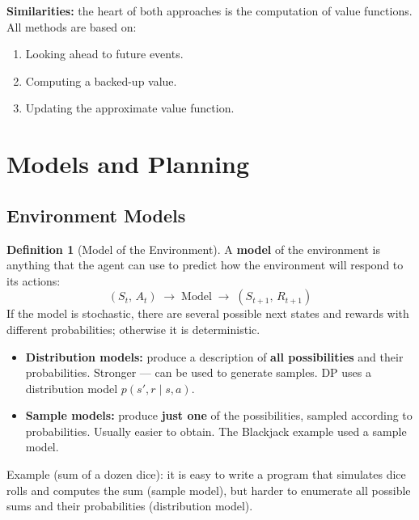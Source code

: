 \documentclass[11pt,a4paper]{article}
\theoremstyle{definition}
\newtheorem{definition}{Definition}[section]
\theoremstyle{plain}
\theoremstyle{remark}
\begin{document}
\textbf{Similarities:} the heart of both approaches is the computation of value functions. All methods are based on:
\begin{enumerate}
    \item Looking ahead to future events.
    \item Computing a backed-up value.
    \item Updating the approximate value function.
\end{enumerate}

\section{Models and Planning}

\subsection{Environment Models}

\begin{definition}[Model of the Environment]
A \textbf{model} of the environment is anything that the agent can use to predict how the environment will respond to its actions:
\[
    (S_t,\, A_t) \;\longrightarrow\; \text{Model} \;\longrightarrow\; (S_{t+1},\, R_{t+1})
\]
If the model is stochastic, there are several possible next states and rewards with different probabilities; otherwise it is deterministic.
\end{definition}

\begin{tcolorbox}[colback=blue!5!white, colframe=blue!60!black, title={Distribution Models vs Sample Models}]
\begin{itemize}
    \item \textbf{Distribution models:} produce a description of \textbf{all possibilities} and their probabilities. Stronger — can be used to generate samples. DP uses a distribution model $p(s', r \mid s, a)$.
    \item \textbf{Sample models:} produce \textbf{just one} of the possibilities, sampled according to probabilities. Usually easier to obtain. The Blackjack example used a sample model.
\end{itemize}
\end{tcolorbox}

Example (sum of a dozen dice): it is easy to write a program that simulates dice rolls and computes the sum (sample model), but harder to enumerate all possible sums and their probabilities (distribution model).
\end{document}
